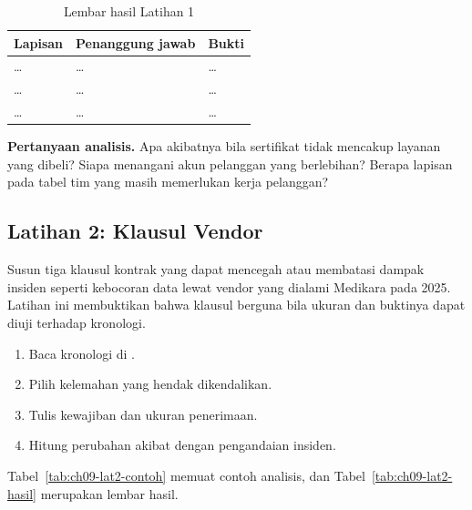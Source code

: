 \begin{table}[!htb]
  \centering\small
  \caption{Lembar hasil Latihan 1}\label{tab:ch09-lat1-hasil}
  \begin{tabularx}{\textwidth}{|>{\raggedright\arraybackslash}X|>{\raggedright\arraybackslash}X|>{\raggedright\arraybackslash}X|}
    \hline
    \textbf{Lapisan} & \textbf{Penanggung jawab} & \textbf{Bukti} \\ \hline
    \dots & \dots & \dots \\ \hline
    \dots & \dots & \dots \\ \hline
    \dots & \dots & \dots \\ \hline
  \end{tabularx}
\end{table}

\textbf{Pertanyaan analisis.} Apa akibatnya bila sertifikat tidak mencakup layanan yang dibeli?
Siapa menangani akun pelanggan yang berlebihan? Berapa lapisan pada tabel tim yang masih memerlukan
kerja pelanggan?

\subsection*{Latihan 2: Klausul Vendor}

Susun tiga klausul kontrak yang dapat mencegah atau membatasi dampak insiden seperti kebocoran data
lewat vendor yang dialami Medikara pada 2025. Latihan ini membuktikan bahwa klausul berguna bila
ukuran dan buktinya dapat diuji terhadap kronologi.

\begin{enumerate}
  \item Baca kronologi di .
  \item Pilih kelemahan yang hendak dikendalikan.
  \item Tulis kewajiban dan ukuran penerimaan.
  \item Hitung perubahan akibat dengan pengandaian insiden.
\end{enumerate}

Tabel~\ref{tab:ch09-lat2-contoh} memuat contoh analisis, dan Tabel~\ref{tab:ch09-lat2-hasil}
merupakan lembar hasil.

